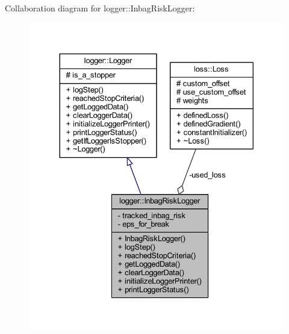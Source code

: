 Collaboration diagram for logger\+:\+:Inbag\+Risk\+Logger\+:
\nopagebreak
\begin{figure}[H]
\begin{center}
\leavevmode
\includegraphics[width=330pt]{classlogger_1_1_inbag_risk_logger__coll__graph}
\end{center}
\end{figure}
